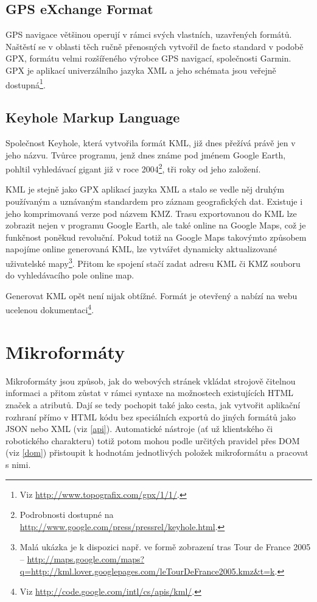 \subsection{GPS eXchange Format}
GPS navigace většinou operují v rámci svých vlastních, uzavřených
formátů. Naštěstí se v oblasti těch ručně přenosných vytvořil de
facto standard v podobě GPX, formátu velmi rozšířeného výrobce GPS
navigací, společnosti Garmin. GPX je aplikací univerzálního jazyka
XML a jeho schémata jsou veřejně dostupná\footnote{Viz
\url{http://www.topografix.com/gpx/1/1/}.}.

\subsection{Keyhole Markup Language}
Společnost Keyhole, která vytvořila formát KML, již dnes přežívá
právě jen v jeho názvu. Tvůrce programu, jenž dnes známe pod jménem
Google Earth, pohltil vyhledávací gigant již v roce
2004\footnote{Podrobnosti dostupné na
\url{http://www.google.com/press/pressrel/keyhole.html}.}, tři roky od
jeho založení.

KML je stejně jako GPX aplikací jazyka XML a stalo se vedle něj
druhým používaným a uznávaným standardem pro záznam geografických
dat. Existuje i jeho komprimovaná verze pod názvem KMZ. Trasu
exportovanou do KML lze zobrazit nejen v programu Google Earth, ale
také online na Google Maps, což je funkčnost poněkud revoluční. Pokud
totiž na Google Maps takovýmto způsobem napojíme online generovaná
KML, lze vytvářet dy\-na\-mic\-ky aktualizované uživatelské
mapy\footnote{Malá ukázka je k dispozici např. ve formě zobrazení tras Tour de France
2005 --
\url{http://maps.google.com/maps?q=http://kml.lover.googlepages.com/leTourDeFrance2005.kmz&t=k}.}.
Přitom ke spojení stačí zadat adresu KML či KMZ souboru do vyhledávacího pole online map.

Generovat KML opět není nijak obtížné. Formát je otevřený a nabízí na
webu ucelenou dokumentaci\footnote{Viz
\url{http://code.google.com/intl/cs/apis/kml/}.}.

\section{Mikroformáty}\label{microformats}
Mikroformáty jsou způsob, jak do webových stránek vkládat strojově
čitelnou informaci a přitom zůstat v rámci syntaxe na možnostech
existujících HTML značek a atributů. Dají se tedy pochopit také jako
cesta, jak vytvořit aplikační rozhraní přímo v HTML kódu bez
speciálních exportů do jiných formátů jako JSON nebo XML (viz
\ref{api}). Automatické nástroje (ať už klientského či robotického
charakteru) totiž potom mohou podle určitých pravidel přes DOM (viz
\ref{dom}) přistoupit k hodnotám jednotlivých položek
mikroformátu a pracovat s nimi.

